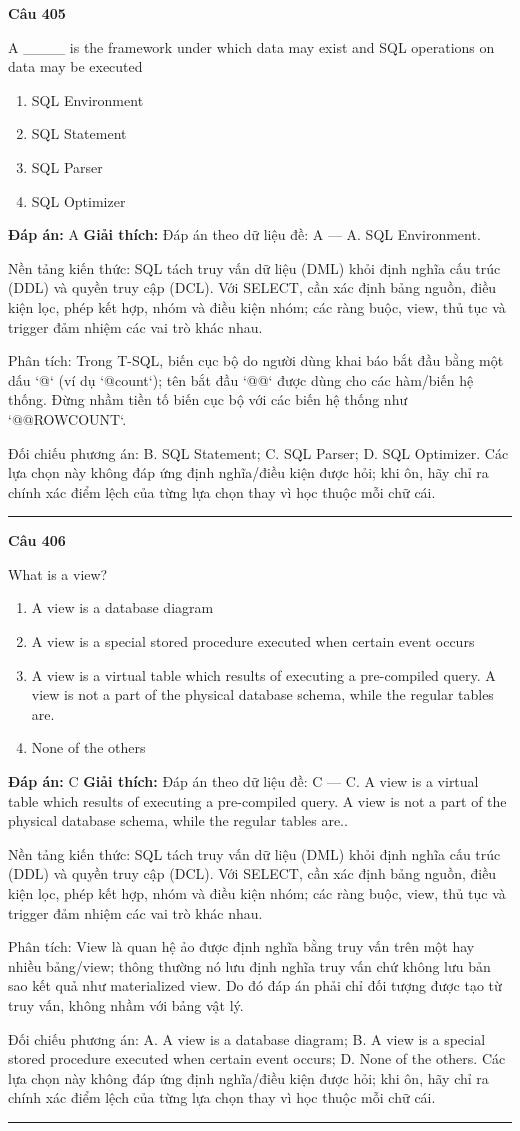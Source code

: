 \documentclass[11pt,a4paper]{article}
\newenvironment{question}[1]{%
  \par\vspace{1em}\noindent\textbf{\large Câu #1}\par\vspace{0.4em}
}{%
  \par\vspace{1em}\hrule\vspace{0.6em}
}
\newenvironment{choices}{%
  \begin{enumerate}[label=\textbf{\Alph*.},leftmargin=2.2em,itemsep=2pt,topsep=3pt]
}{%
  \end{enumerate}
}
\newcommand{\choice}{\item}
\begin{document}
\begin{question}{405}
A ____ is the framework under which data may exist and SQL operations on data may be executed
\begin{choices}
\choice SQL Environment
\choice SQL Statement
\choice SQL Parser
\choice SQL Optimizer
\end{choices}
\textbf{Đáp án:} A
\textbf{Giải thích:} Đáp án theo dữ liệu đề: A — A. SQL Environment.

Nền tảng kiến thức: SQL tách truy vấn dữ liệu (DML) khỏi định nghĩa cấu trúc (DDL) và quyền truy cập (DCL). Với SELECT, cần xác định bảng nguồn, điều kiện lọc, phép kết hợp, nhóm và điều kiện nhóm; các ràng buộc, view, thủ tục và trigger đảm nhiệm các vai trò khác nhau.

Phân tích: Trong T-SQL, biến cục bộ do người dùng khai báo bắt đầu bằng một dấu `@` (ví dụ `@count`); tên bắt đầu `@@` được dùng cho các hàm/biến hệ thống. Đừng nhầm tiền tố biến cục bộ với các biến hệ thống như `@@ROWCOUNT`.

Đối chiếu phương án: B. SQL Statement; C. SQL Parser; D. SQL Optimizer. Các lựa chọn này không đáp ứng định nghĩa/điều kiện được hỏi; khi ôn, hãy chỉ ra chính xác điểm lệch của từng lựa chọn thay vì học thuộc mỗi chữ cái.
\end{question}

\begin{question}{406}
What is a view?
\begin{choices}
\choice A view is a database diagram
\choice A view is a special stored procedure executed when certain event occurs
\choice A view is a virtual table which results of executing a pre-compiled query. A view is not a part of the physical database schema, while the regular tables are.
\choice None of the others
\end{choices}
\textbf{Đáp án:} C
\textbf{Giải thích:} Đáp án theo dữ liệu đề: C — C. A view is a virtual table which results of executing a pre-compiled query. A view is not a part of the physical database schema, while the regular tables are..

Nền tảng kiến thức: SQL tách truy vấn dữ liệu (DML) khỏi định nghĩa cấu trúc (DDL) và quyền truy cập (DCL). Với SELECT, cần xác định bảng nguồn, điều kiện lọc, phép kết hợp, nhóm và điều kiện nhóm; các ràng buộc, view, thủ tục và trigger đảm nhiệm các vai trò khác nhau.

Phân tích: View là quan hệ ảo được định nghĩa bằng truy vấn trên một hay nhiều bảng/view; thông thường nó lưu định nghĩa truy vấn chứ không lưu bản sao kết quả như materialized view. Do đó đáp án phải chỉ đối tượng được tạo từ truy vấn, không nhầm với bảng vật lý.

Đối chiếu phương án: A. A view is a database diagram; B. A view is a special stored procedure executed when certain event occurs; D. None of the others. Các lựa chọn này không đáp ứng định nghĩa/điều kiện được hỏi; khi ôn, hãy chỉ ra chính xác điểm lệch của từng lựa chọn thay vì học thuộc mỗi chữ cái.
\end{question}
\end{document}
